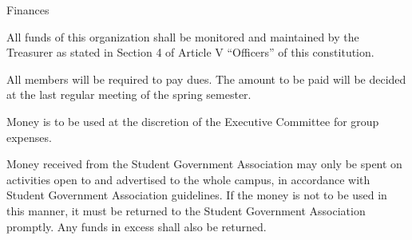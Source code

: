 {
	\begin{article}{Finances}
		\item All funds of this organization shall be monitored and maintained by the Treasurer as stated in Section 4 of Article V \enquote{Officers} of this constitution.
		\item All members will be required to pay dues.  The amount to be paid will be decided at the last regular meeting of the spring semester.
		\item Money is to be used at the discretion of the Executive Committee for group expenses.
		\item Money received from the Student Government Association may only be spent on activities open to and advertised to the whole campus, in accordance with Student Government Association guidelines.  If the money is not to be used in this manner, it must be returned to the Student Government Association promptly.  Any funds in excess shall also be returned.
	\end{article}
}